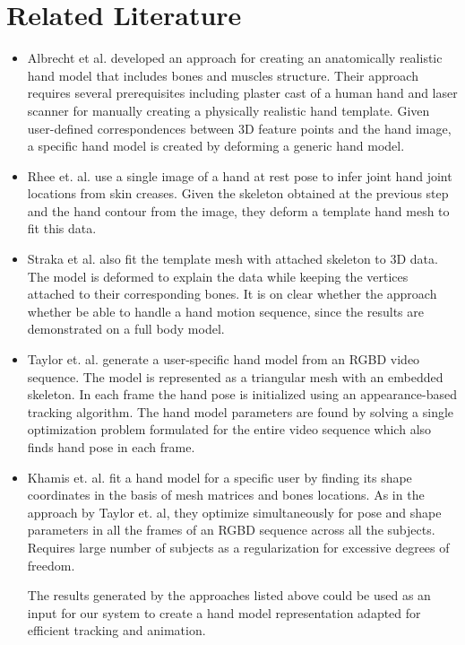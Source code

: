 \section{Related Literature}

\begin{itemize}

\item Albrecht et al. \cite{albrecht2003construction} developed an approach for creating an anatomically realistic hand model that includes bones and muscles structure. Their approach requires several prerequisites including plaster cast of a human hand and laser scanner for manually creating a physically realistic hand template. Given user-defined correspondences between 3D feature points and the hand image, a specific hand model is created by deforming a generic hand model. 

\item Rhee et. al. \cite{rhee2006human} use a single image of a hand at rest pose to infer joint hand joint locations from skin creases. Given the skeleton obtained at the previous step and the hand contour from the image, they deform a template hand mesh to fit this data. 

\item Straka et al. \cite{straka2012simultaneous} also fit the template mesh with attached skeleton to 3D data. The model is deformed to explain the data while keeping the vertices attached to their corresponding bones. It is on clear whether the approach whether be able to handle a hand motion sequence, since the results are demonstrated on a full body model.

\item Taylor et. al. \cite{taylor2014user} generate a user-specific hand model from an RGBD video sequence. The model is represented as a triangular mesh with an embedded skeleton. In each frame the hand pose is initialized using an appearance-based tracking algorithm. The hand model parameters are found by solving a single optimization problem formulated for the entire video sequence which also finds hand pose in each frame. 

\item Khamis et. al.  \cite{khamis12learning} fit a hand model for a specific user by finding its shape coordinates in the basis of mesh matrices and bones locations. As in the approach by Taylor et. al, they optimize simultaneously for pose and shape parameters in all the frames of an RGBD sequence across all the subjects. Requires large number of subjects as a regularization for excessive degrees of freedom. 

The results generated by the approaches listed above could be used as an input for our system to create a hand model representation adapted for efficient tracking and animation.


\end{itemize}